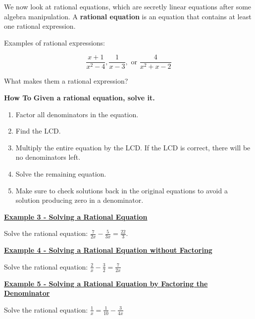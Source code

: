 \documentclass[12pt]{book}
\newcommand{\D}{\displaystyle}
\begin{document}
We now look at rational equations, which are secretly linear equations after some algebra manipulation. 
\vspace{5mm}
A \textbf{rational equation} is an equation that contains at least one rational expression. 

Examples of rational expressions:

$$\frac{x+1}{x^2-4}, \frac{1}{x-3}, \text{ or } \frac{4}{x^2+x-2}$$
\vspace{3mm}

What makes them a rational expression? 

\vspace{15mm}
\begin{boxR}
    \textbf{How To}
    \vspace{1mm}
    \hline
      \vspace{2mm}
   \textbf{Given a rational equation, solve it.} 

    \begin{enumerate}
     \item Factor all denominators in the equation.
     \item Find the LCD.
     \item Multiply the entire equation by the LCD. If the LCD is correct, there will be no denominators left.
     \item Solve the remaining equation.
     \item Make sure to check solutions back in the original equations to avoid a solution producing zero in a denominator.
       \end{enumerate}
\end{boxR}
\newpage
\underline{\textbf{Example 3 - Solving a Rational Equation}}

\vspace{1mm}
Solve the rational equation: $\D \frac{7}{2x}-\frac{5}{3x}=\frac{22}{3}$.
\newpage

\underline{\textbf{Example 4 - Solving a Rational Equation without Factoring}}

\vspace{1mm}
Solve the rational equation: $\D \frac{2}{x}-\frac{3}{2}=\frac{7}{2x}$

\vspace{80mm}
\underline{\textbf{Example 5 - Solving a Rational Equation by Factoring the Denominator}}

\vspace{1mm}
Solve the rational equation: $\D \frac{1}{x}=\frac{1}{10}-\frac{3}{4x}$
\end{document}
